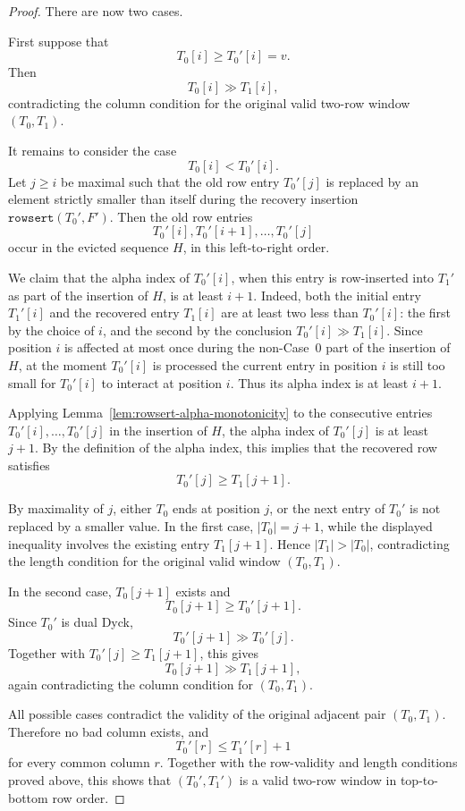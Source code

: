 \documentclass[11pt]{article}
\theoremstyle{plain}
\theoremstyle{definition}
\theoremstyle{remark}
\newcommand{\rowsert}{\texttt{rowsert}}
\begin{document}
\begin{proof}
There are now two cases.

First suppose that
\[
  T_0[i]\ge T_0'[i]=v.
\]
Then
\[
  T_0[i]\gg T_1[i],
\]
contradicting the column condition for the original valid two-row window
\((T_0,T_1)\).

It remains to consider the case
\[
  T_0[i]<T_0'[i].
\]
Let \(j\ge i\) be maximal such that the old row entry \(T_0'[j]\) is replaced
by an element strictly smaller than itself during the recovery insertion
\(\rowsert(T_0',F')\).  Then the old row entries
\[
  T_0'[i],T_0'[i+1],\ldots,T_0'[j]
\]
occur in the evicted sequence \(H\), in this left-to-right order.

We claim that the alpha index of \(T_0'[i]\), when this entry is row-inserted
into \(T_1'\) as part of the insertion of \(H\), is at least \(i+1\).  Indeed,
both the initial entry \(T_1'[i]\) and the recovered entry \(T_1[i]\) are at
least two less than \(T_0'[i]\): the first by the choice of \(i\), and the
second by the conclusion \(T_0'[i]\gg T_1[i]\).  Since position \(i\) is affected
at most once during the non-Case~0 part of the insertion of \(H\), at the moment
\(T_0'[i]\) is processed the current entry in position \(i\) is still too small
for \(T_0'[i]\) to interact at position \(i\).  Thus its alpha index is at least
\(i+1\).

Applying Lemma~\ref{lem:rowsert-alpha-monotonicity} to the consecutive entries
\(T_0'[i],\ldots,T_0'[j]\) in the insertion of \(H\), the alpha index of
\(T_0'[j]\) is at least \(j+1\).  By the definition of the alpha index, this
implies that the recovered row satisfies
\[
  T_0'[j]\ge T_1[j+1].
\]

By maximality of \(j\), either \(T_0\) ends at position \(j\), or the next entry
of \(T_0'\) is not replaced by a smaller value.  In the first case,
\(|T_0|=j+1\), while the displayed inequality involves the existing entry
\(T_1[j+1]\).  Hence \(|T_1|>|T_0|\), contradicting the length condition for the
original valid window \((T_0,T_1)\).

In the second case, \(T_0[j+1]\) exists and
\[
  T_0[j+1]\ge T_0'[j+1].
\]
Since \(T_0'\) is dual Dyck,
\[
  T_0'[j+1]\gg T_0'[j].
\]
Together with \(T_0'[j]\ge T_1[j+1]\), this gives
\[
  T_0[j+1]\gg T_1[j+1],
\]
again contradicting the column condition for \((T_0,T_1)\).

All possible cases contradict the validity of the original adjacent pair
\((T_0,T_1)\).  Therefore no bad column exists, and
\[
  T_0'[r]\le T_1'[r]+1
\]
for every common column \(r\).  Together with the row-validity and length
conditions proved above, this shows that \((T_0',T_1')\) is a valid two-row
window in top-to-bottom row order.
\end{proof}
\end{document}
